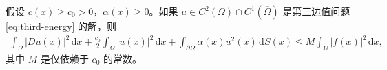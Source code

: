 \documentclass[../../main.tex]{subfiles}%
\begin{document}
\begin{theorem}
假设 $c(x)\geqslant c_0>0$，$\alpha(x)\geqslant 0$。如果 $u\in C^2(\Omega)\cap C^1(\overline{\Omega})$ 是第三边值问题 \eqref{eq:third-energy} 的解，则
\begin{align}
\int_\Omega |Du(x)|^2\,\mathrm{d}x + \frac{c_0}{2}\int_\Omega |u(x)|^2\,\mathrm{d}x + \int_{\partial\Omega} \alpha(x)u^2(x)\,\mathrm{d}S(x) \leqslant M\int_\Omega |f(x)|^2\,\mathrm{d}x, \label{eq:energy-est-third}
\end{align}
其中 $M$ 是仅依赖于 $c_0$ 的常数。
\end{theorem}
\end{document}
